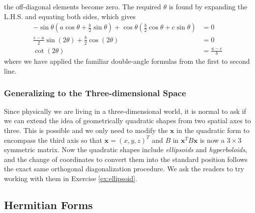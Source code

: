 the off-diagonal elements become zero. The required $\theta$ is found by expanding the L.H.S. and equating both sides, which gives
\begin{align*}
-\sin \theta (a \cos\theta + \frac{b}{2}\sin \theta) + \cos\theta (\frac{b}{2} \cos \theta + c\sin \theta) &= 0 \\
\frac{c-a}{2} \sin (2\theta) + \frac{b}{2}\cos(2\theta) &= 0 \\
\cot(2\theta) &= \frac{a-c}{b}
\end{align*}
where we have applied the familiar double-angle formulas from the first to second line.

\subsubsection{Generalizing to the Three-dimensional Space}
Since physically we are living in a three-dimensional world, it is normal to ask if we can extend the idea of geometrically quadratic shapes from two spatial axes to three. This is possible and we only need to modify the $\textbf{x}$ in the quadratic form to encompass the third axis so that $\textbf{x} = (x,y,z)^T$ and $B$ in $\textbf{x}^TB\textbf{x}$ is now a $3 \times 3$ symmetric matrix. Now the quadratic shapes include \textit{ellipsoids} and \textit{hyperboloids}, and the change of coordinates to convert them into the standard position follows the exact same orthogonal diagonalization procedure. We ask the readers to try working with them in Exercise \ref{ex:ellipsoid}.

\subsection{Hermitian Forms}
\label{section:hermform}

